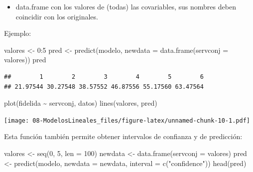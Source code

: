 \documentclass[
]{book}
\newenvironment{Shaded}{\begin{snugshade}}{\end{snugshade}}
\newcommand{\AttributeTok}[1]{\textcolor[rgb]{0.77,0.63,0.00}{#1}}
\newcommand{\DecValTok}[1]{\textcolor[rgb]{0.00,0.00,0.81}{#1}}
\newcommand{\FunctionTok}[1]{\textcolor[rgb]{0.00,0.00,0.00}{#1}}
\newcommand{\NormalTok}[1]{#1}
\newcommand{\OtherTok}[1]{\textcolor[rgb]{0.56,0.35,0.01}{#1}}
\newcommand{\SpecialCharTok}[1]{\textcolor[rgb]{0.00,0.00,0.00}{#1}}
\newcommand{\StringTok}[1]{\textcolor[rgb]{0.31,0.60,0.02}{#1}}
\providecommand{\tightlist}{%
  \setlength{\itemsep}{0pt}\setlength{\parskip}{0pt}}
\theoremstyle{break}
\theoremstyle{nonumberplain}
\begin{document}
\begin{itemize}
\tightlist
\item
  data.frame con los valores de (todas) las covariables, sus nombres
  deben coincidir con los originales.
\end{itemize}

Ejemplo:

\begin{Shaded}
\begin{Highlighting}[]
\NormalTok{valores }\OtherTok{\textless{}{-}} \DecValTok{0}\SpecialCharTok{:}\DecValTok{5}
\NormalTok{pred }\OtherTok{\textless{}{-}} \FunctionTok{predict}\NormalTok{(modelo, }\AttributeTok{newdata =} \FunctionTok{data.frame}\NormalTok{(}\AttributeTok{servconj =}\NormalTok{ valores))}
\NormalTok{pred}
\end{Highlighting}
\end{Shaded}

\begin{verbatim}
##        1        2        3        4        5        6 
## 21.97544 30.27548 38.57552 46.87556 55.17560 63.47564
\end{verbatim}

\begin{Shaded}
\begin{Highlighting}[]
\FunctionTok{plot}\NormalTok{(fidelida }\SpecialCharTok{\textasciitilde{}}\NormalTok{ servconj, datos)}
\FunctionTok{lines}\NormalTok{(valores, pred)}
\end{Highlighting}
\end{Shaded}

\texttt{[image: 08-ModelosLineales\_files/figure-latex/unnamed-chunk-10-1.pdf]}

Esta función también permite obtener intervalos de confianza y de predicción:

\begin{Shaded}
\begin{Highlighting}[]
\NormalTok{valores }\OtherTok{\textless{}{-}} \FunctionTok{seq}\NormalTok{(}\DecValTok{0}\NormalTok{, }\DecValTok{5}\NormalTok{, }\AttributeTok{len =} \DecValTok{100}\NormalTok{)}
\NormalTok{newdata }\OtherTok{\textless{}{-}} \FunctionTok{data.frame}\NormalTok{(}\AttributeTok{servconj =}\NormalTok{ valores)}
\NormalTok{pred }\OtherTok{\textless{}{-}} \FunctionTok{predict}\NormalTok{(modelo, }\AttributeTok{newdata =}\NormalTok{ newdata, }\AttributeTok{interval =} \FunctionTok{c}\NormalTok{(}\StringTok{"confidence"}\NormalTok{))}
\FunctionTok{head}\NormalTok{(pred)}
\end{Highlighting}
\end{Shaded}
\end{document}
